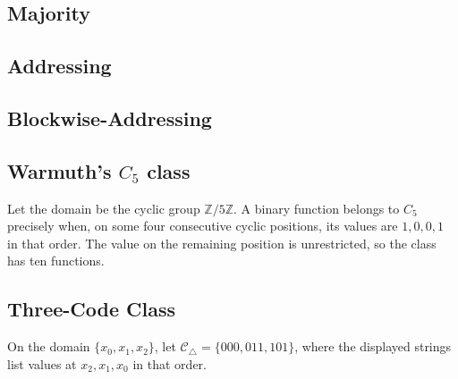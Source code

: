   \subsection{Majority}\label{cl:majority}
  \begin{definition}
  
  \end{definition}
  
  \subsection{Addressing}\label{cl:addressing}
  \begin{definition}
  
  \end{definition}
  
  \subsection{Blockwise-Addressing}\label{cl:blockwise-addressing}
  \begin{definition}
  
  \end{definition}

  \subsection{Warmuth's $C_5$ class}\label{cl:warmuth_c5}
  \begin{definition}
  Let the domain be the cyclic group $\mathbb{Z}/5\mathbb{Z}$.  A binary
  function belongs to $C_5$ precisely when, on some four consecutive cyclic
  positions, its values are $1,0,0,1$ in that order.  The value on the
  remaining position is unrestricted, so the class has ten functions.
  \end{definition}

  \subsection{Three-Code Class}\label{cl:three_code_class}
  \begin{definition}
  On the domain $\{x_0,x_1,x_2\}$, let
  $\mathcal C_{\triangle}=\{000,011,101\}$, where the displayed strings
  list values at $x_2,x_1,x_0$ in that order.
  \end{definition}

